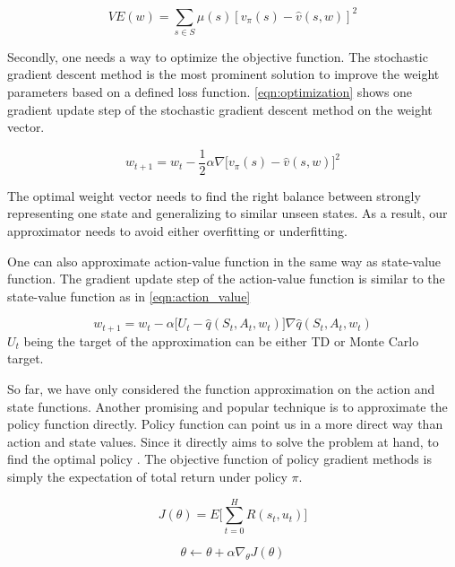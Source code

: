 \begin{equation}
    \label{eqn:state-value}
    VE(w) = \sum\limits_{s\in S} \mu(s)[v_\pi(s) - \hat{v}(s,w)]^2
\end{equation}


Secondly, one needs a way to optimize the objective function. The stochastic gradient descent method is the most prominent solution to improve the weight parameters based on a defined loss function. \ref{eqn:optimization} shows one gradient update step of the stochastic gradient descent method on the weight vector.  

\begin{equation}
    \label{eqn:optimization}
    w_{t+1} = w_t - \frac{1}{2}\alpha\nabla\Big[v_{\pi}(s) - \hat{v}(s,w)\Big]^2
\end{equation}

The optimal weight vector needs to find the right balance between strongly representing one state and generalizing to similar unseen states. As a result, our approximator needs to avoid either overfitting or underfitting.


One can also approximate action-value function in the same way as state-value function. The gradient update step of the action-value function is similar to the state-value function as in \ref{eqn:action_value}

\begin{equation}
    \label{eqn:action_value}
    w_{t+1} = w_t -\alpha\Big[U_t - \hat{q}(S_t,A_t, w_t)\Big]\nabla\hat{q}(S_t, A_t, w_t)
\end{equation}
\(U_t\) being the target of the approximation can be either TD or Monte Carlo target.


So far, we have only considered the function approximation on the action and state functions.  Another promising and popular technique is to approximate the policy function directly. Policy function can point us in a more direct way than action and state values. Since it directly aims to solve the problem at hand, to find the optimal policy \cite{SpinningUp2018}.
The objective function of policy gradient methods is simply the expectation of total return under policy \(\pi\).

\begin{equation}
    \label{eqn:policy-objective}
    J(\theta) = E\Big[\sum\limits_{t=0}^H R(s_t, u_t)\Big]
\end{equation}


\begin{equation}
    \theta \leftarrow \theta + \alpha\nabla_{\theta}J(\theta) 
\end{equation}